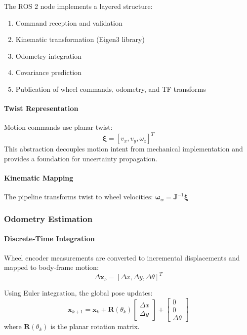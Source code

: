 The ROS 2 node implements a layered structure:
\begin{enumerate}
    \item Command reception and validation
    \item Kinematic transformation (Eigen3 library)
    \item Odometry integration
    \item Covariance prediction
    \item Publication of wheel commands, odometry, and TF transforms
\end{enumerate}

\paragraph{Twist Representation}
Motion commands use planar twist:
\begin{equation}
\boldsymbol{\xi} = [v_x, v_y, \omega_z]^T
\label{eq:twist_rep}
\end{equation}
This abstraction decouples motion intent from mechanical implementation and provides a foundation for uncertainty propagation.

\paragraph{Kinematic Mapping}
The pipeline transforms twist to wheel velocities: $\boldsymbol{\omega}_w = \mathbf{J}^{-1} \boldsymbol{\xi}$

\subsubsection{Odometry Estimation}

\paragraph{Discrete-Time Integration}
Wheel encoder measurements are converted to incremental displacements and mapped to body-frame motion:
\begin{equation}
\Delta \mathbf{x}_b = [\Delta x, \Delta y, \Delta \theta]^T
\label{eq:body_increment}
\end{equation}

Using Euler integration, the global pose updates:
\begin{equation}
\mathbf{x}_{k+1} = \mathbf{x}_k + \mathbf{R}(\theta_k) \begin{bmatrix} \Delta x \\ \Delta y \end{bmatrix} + \begin{bmatrix} 0 \\ 0 \\ \Delta \theta \end{bmatrix}
\label{eq:euler_integration}
\end{equation}
where $\mathbf{R}(\theta_k)$ is the planar rotation matrix.

